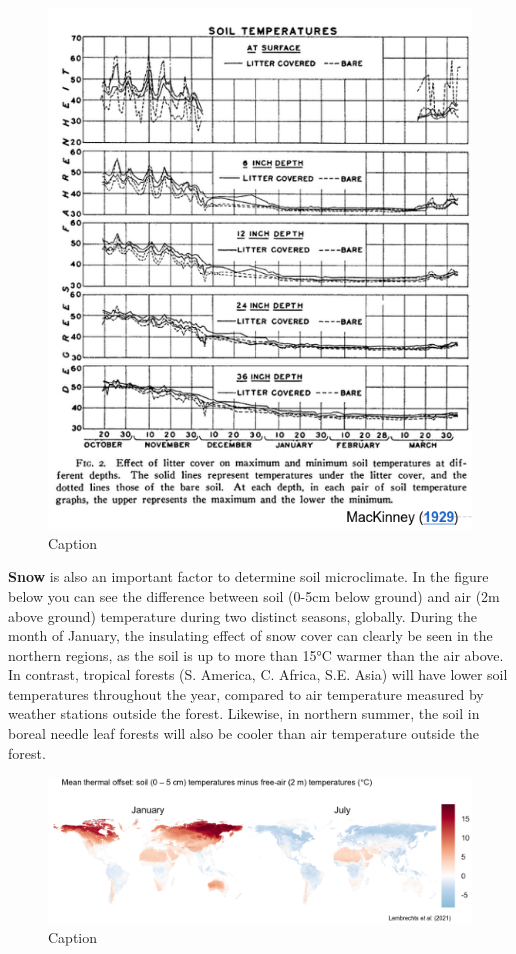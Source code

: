 \documentclass[12pt,oneside]{book}
\begin{document}
\begin{figure}

{\centering \includegraphics[width=0.8\linewidth]{figures/Figure1013} 

}

\caption{Caption}\label{fig:Micro13}
\end{figure}

\textbf{Snow} is also an important factor to determine soil
microclimate. In the figure below you can see the difference between
soil (0-5cm below ground) and air (2m above ground) temperature during
two distinct seasons, globally. During the month of January, the
insulating effect of snow cover can clearly be seen in the northern
regions, as the soil is up to more than 15°C warmer than the air above.
In contrast, tropical forests (S. America, C. Africa, S.E. Asia) will
have lower soil temperatures throughout the year, compared to air
temperature measured by weather stations outside the forest. Likewise,
in northern summer, the soil in boreal needle leaf forests will also be
cooler than air temperature outside the forest.

\begin{figure}

{\centering \includegraphics[width=1\linewidth]{figures/Figure1014} 

}

\caption{Caption}\label{fig:Micro14}
\end{figure}
\end{document}

